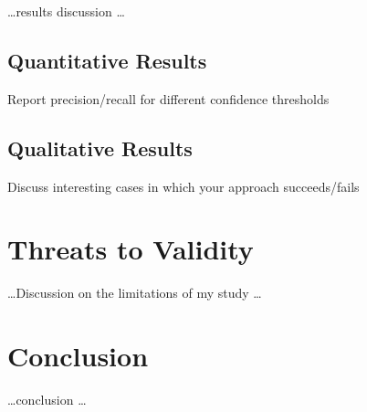 \documentclass[11pt, mscthesis]{usiinfthesis}
\begin{document}
\dots results discussion \dots 

\section{Quantitative Results}
Report precision/recall for different confidence thresholds


\section{Qualitative Results}
Discuss interesting cases in which your approach succeeds/fails



\chapter{Threats to Validity}

\dots Discussion on the limitations of my study \dots 


\chapter{Conclusion}

\dots conclusion \dots 


\nocite{*}
\backmatter


%
%
%
%



\printbibliography
\end{document}
